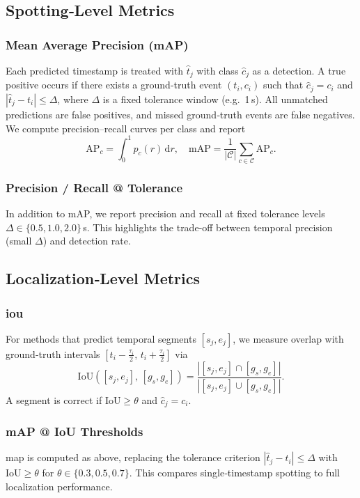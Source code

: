 \subsection{Spotting‑Level Metrics}
\subsubsection{Mean Average Precision (mAP)}
Each predicted timestamp is treated with $\hat t_j$ with class $\hat c_j$ as a detection. A true positive occurs if there exists a ground‑truth event $(t_i,c_i)$ such that $\hat c_j = c_i$ and $|\hat t_j - t_i|\le\Delta$, where $\Delta$ is a fixed tolerance window (e.g.\ 1\,s). All unmatched predictions are false positives, and missed ground‑truth events are false negatives. We compute precision–recall curves per class and report
\[
\mathrm{AP}_c = \int_{0}^{1} p_c(r)\,\mathrm{d}r,\quad
\mathrm{mAP} = \frac{1}{|\mathcal{C}|}\sum_{c\in\mathcal{C}}\mathrm{AP}_c.
\]

\subsubsection{Precision / Recall @ Tolerance}
In addition to mAP, we report precision and recall at fixed tolerance levels $\Delta\in\{0.5,1.0,2.0\}$\,s. This highlights the trade‑off between temporal precision (small $\Delta$) and detection rate.

\subsection{Localization‑Level Metrics}
\subsubsection{\acrfull{iou}}
For methods that predict temporal segments $[s_j,e_j]$, we measure overlap with ground‑truth intervals $[t_i-\tfrac{\tau_i}{2},\,t_i+\tfrac{\tau_i}{2}]$ via
\[
\mathrm{IoU}([s_j,e_j],\,[g_s,g_e]) 
= \frac{|[s_j,e_j]\cap [g_s,g_e]|}{|[s_j,e_j]\cup [g_s,g_e]|}.
\]
A segment is correct if $\mathrm{IoU}\!\ge\theta$ and $\hat c_j=c_i$.

\subsubsection{mAP @ IoU Thresholds}
\acrshort{map} is computed as above, replacing the tolerance criterion $|\hat t_j - t_i|\le\Delta$ with $\mathrm{IoU}\ge\theta$ for $\theta\in\{0.3,0.5,0.7\}$. This compares single‑timestamp spotting to full localization performance.

